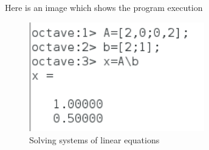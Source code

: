 \documentclass[a4paper,12pt]{article}
\begin{document}
\par
Here is an image which shows the program execution
\begin{figure}[H]
    \centering
    \includegraphics[width=3.0in]{img/4.png}
    \caption{Solving systems of linear equations}
    \label{simulationfigure}
\end{figure}
\end{document}
